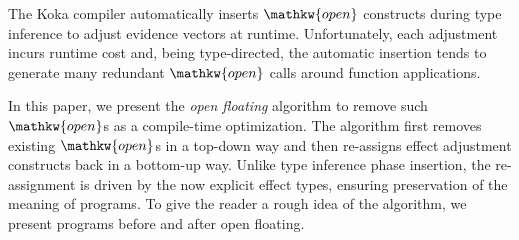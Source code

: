 \documentclass{llncs}
\begin{document}
The Koka compiler automatically inserts $\mathpre{\mathkw{open}}$
constructs during type inference to adjust evidence vectors at runtime.
Unfortunately, each adjustment incurs runtime cost and,
being type-directed, the automatic insertion tends to generate many redundant $\mathpre{\mathkw{open}}$ calls around function applications.%

In this paper, we present the \emph{open floating} algorithm to remove such $\mathpre{\mathkw{open}}$s as a compile-time optimization.
The algorithm first removes existing $\mathpre{\mathkw{open}}$s in a top-down way and
then re-assigns effect adjustment constructs back in a bottom-up way.
Unlike type inference phase insertion, the re-assignment is driven by the now explicit effect types,
ensuring preservation of the meaning of programs.
To give the reader a rough idea of the algorithm, we present programs before and after open floating.%
\end{document}
